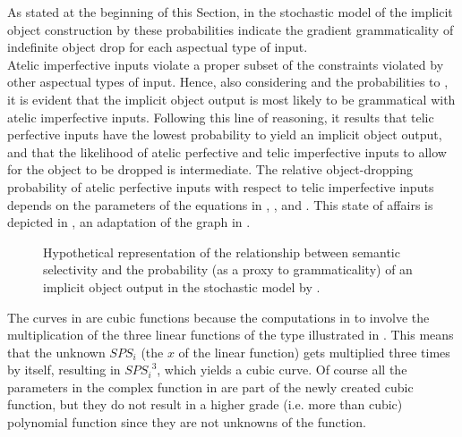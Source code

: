 As stated at the beginning of this Section, in the stochastic model of the implicit object construction by \textcite{Medina2007} these probabilities indicate the gradient grammaticality of indefinite object drop for each aspectual type of input.\\
Atelic imperfective inputs violate a proper subset of the constraints violated by other aspectual types of input. Hence, also considering  and the probabilities  to , it is evident that the implicit object output is most likely to be grammatical with atelic imperfective inputs. Following this line of reasoning, it results that telic perfective inputs have the lowest probability to yield an implicit object output, and that the likelihood of atelic perfective and telic imperfective inputs to allow for the object to be dropped is intermediate. The relative object-dropping probability of atelic perfective inputs with respect to telic imperfective inputs depends on the parameters of the equations in , , and . This state of affairs is depicted in , an adaptation of the graph in \textcite[108]{Medina2007}.

\begin{figure}[htb]
\caption{Hypothetical representation of the relationship between semantic selectivity and the probability (as a proxy to grammaticality) of an implicit object output in the stochastic model by \textcite{Medina2007}. }
\end{figure}

The curves in  are cubic functions because the computations in  to  involve the multiplication of the three linear functions of the type illustrated in . This means that the unknown $SPS_i$ (the $x$ of the linear function) gets multiplied three times by itself, resulting in ${SPS_i}^3$, which yields a cubic curve. Of course all the parameters in the complex function in  are part of the newly created cubic function, but they do not result in a higher grade (i.e. more than cubic) polynomial function since they are not unknowns of the function.

